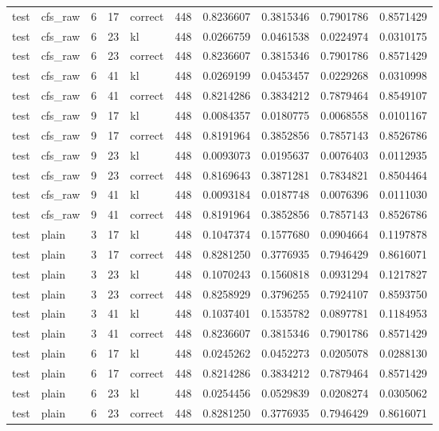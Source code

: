 \begin{tabular}{llrrlrrrrr}
test & cfs_raw & 6 & 17 & correct & 448 & 0.8236607 & 0.3815346 & 0.7901786 & 0.8571429 \\
test & cfs_raw & 6 & 23 & kl & 448 & 0.0266759 & 0.0461538 & 0.0224974 & 0.0310175 \\
test & cfs_raw & 6 & 23 & correct & 448 & 0.8236607 & 0.3815346 & 0.7901786 & 0.8571429 \\
test & cfs_raw & 6 & 41 & kl & 448 & 0.0269199 & 0.0453457 & 0.0229268 & 0.0310998 \\
test & cfs_raw & 6 & 41 & correct & 448 & 0.8214286 & 0.3834212 & 0.7879464 & 0.8549107 \\
test & cfs_raw & 9 & 17 & kl & 448 & 0.0084357 & 0.0180775 & 0.0068558 & 0.0101167 \\
test & cfs_raw & 9 & 17 & correct & 448 & 0.8191964 & 0.3852856 & 0.7857143 & 0.8526786 \\
test & cfs_raw & 9 & 23 & kl & 448 & 0.0093073 & 0.0195637 & 0.0076403 & 0.0112935 \\
test & cfs_raw & 9 & 23 & correct & 448 & 0.8169643 & 0.3871281 & 0.7834821 & 0.8504464 \\
test & cfs_raw & 9 & 41 & kl & 448 & 0.0093184 & 0.0187748 & 0.0076396 & 0.0111030 \\
test & cfs_raw & 9 & 41 & correct & 448 & 0.8191964 & 0.3852856 & 0.7857143 & 0.8526786 \\
test & plain & 3 & 17 & kl & 448 & 0.1047374 & 0.1577680 & 0.0904664 & 0.1197878 \\
test & plain & 3 & 17 & correct & 448 & 0.8281250 & 0.3776935 & 0.7946429 & 0.8616071 \\
test & plain & 3 & 23 & kl & 448 & 0.1070243 & 0.1560818 & 0.0931294 & 0.1217827 \\
test & plain & 3 & 23 & correct & 448 & 0.8258929 & 0.3796255 & 0.7924107 & 0.8593750 \\
test & plain & 3 & 41 & kl & 448 & 0.1037401 & 0.1535782 & 0.0897781 & 0.1184953 \\
test & plain & 3 & 41 & correct & 448 & 0.8236607 & 0.3815346 & 0.7901786 & 0.8571429 \\
test & plain & 6 & 17 & kl & 448 & 0.0245262 & 0.0452273 & 0.0205078 & 0.0288130 \\
test & plain & 6 & 17 & correct & 448 & 0.8214286 & 0.3834212 & 0.7879464 & 0.8571429 \\
test & plain & 6 & 23 & kl & 448 & 0.0254456 & 0.0529839 & 0.0208274 & 0.0305062 \\
test & plain & 6 & 23 & correct & 448 & 0.8281250 & 0.3776935 & 0.7946429 & 0.8616071 \\

\end{tabular}
